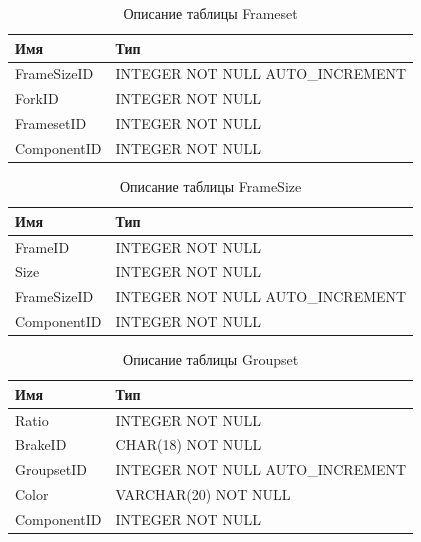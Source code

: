 
\begin{table}[h!] 
	\centering
	\caption{Описание таблицы Frameset}
	\begin{tabular}{|l|l|}
		\hline \textbf{Имя} & \textbf{Тип} \\
		\hline
		FrameSizeID &   INTEGER NOT NULL AUTO\_INCREMENT \\ \hline
		ForkID &        INTEGER NOT NULL \\ \hline
		FramesetID &    INTEGER NOT NULL \\ \hline
		ComponentID &   INTEGER NOT NULL \\ \hline
	\end{tabular}
	\label{tab:frameset}
\end{table}



\begin{table}[h!] 
	\centering
	\caption{Описание таблицы FrameSize}
	\begin{tabular}{|l|l|}
		\hline \textbf{Имя} & \textbf{Тип} \\
		\hline
		FrameID &       INTEGER NOT NULL \\ \hline
		Size &  INTEGER NOT NULL \\ \hline
		FrameSizeID &   INTEGER NOT NULL AUTO\_INCREMENT \\ \hline
		ComponentID &   INTEGER NOT NULL \\ \hline
	\end{tabular}
	\label{tab:framesize}
\end{table}



\begin{table}[h!] 
	\centering
	\caption{Описание таблицы Groupset}
	\small
	\begin{tabular}{|l|l|}
		\hline \textbf{Имя} & \textbf{Тип} \\
		\hline
		Ratio & INTEGER NOT NULL \\ \hline
		BrakeID &       CHAR(18) NOT NULL \\ \hline
		GroupsetID &    INTEGER NOT NULL AUTO\_INCREMENT \\ \hline
		Color & VARCHAR(20) NOT NULL \\ \hline
		ComponentID &   INTEGER NOT NULL \\ \hline
	\end{tabular}
	\label{tab:groupset}
\end{table}


